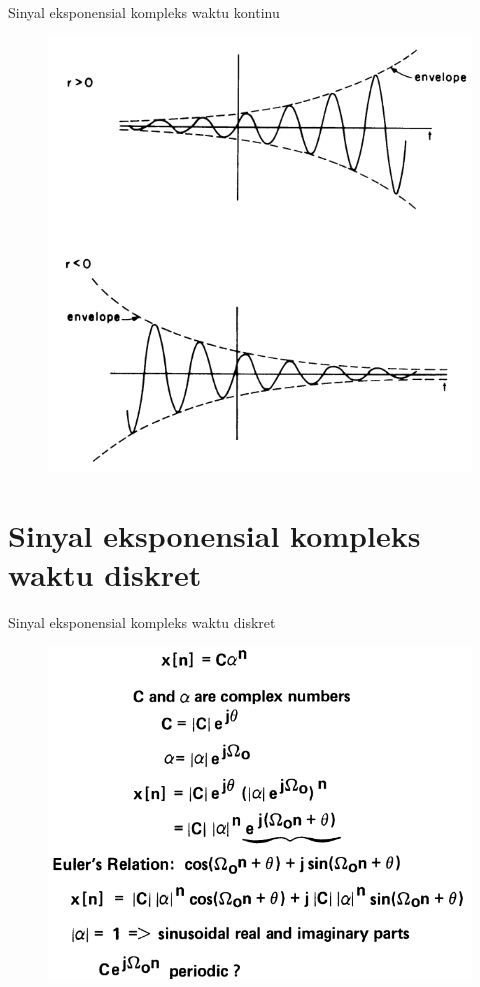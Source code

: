 \documentclass[pdflatex,compress,mathserif]{beamer}
\begin{document}
\begin{frame}{Sinyal eksponensial kompleks waktu kontinu}
	\begin{figure}
		\centering
		\includegraphics[height=0.8\textheight]{img/01.slide_17}
	\end{figure}
\end{frame}

\section{Sinyal eksponensial kompleks waktu diskret}
\begin{frame}{Sinyal eksponensial kompleks waktu diskret}
	\begin{figure}
		\centering
		\includegraphics[height=0.8\textheight]{img/01.slide_18}
	\end{figure}
\end{frame}
\end{document}
